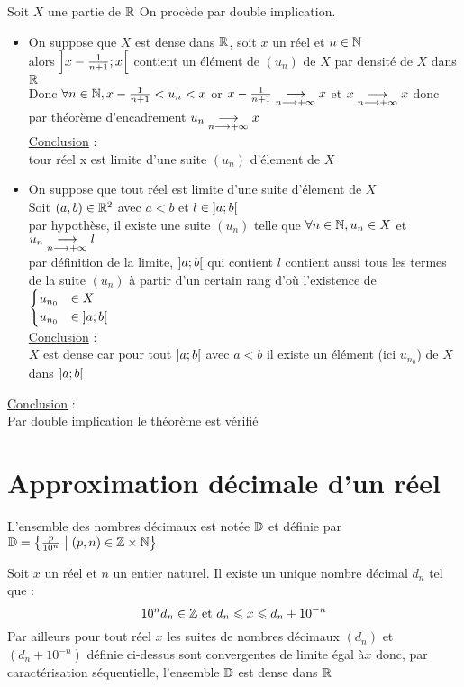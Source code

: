 \begin{dem}
    Soit \(X\) une partie de \(\mathbb{R}\)
    On procède par double implication.
    \begin{itemize}
    \item[\impdir]
    On suppose que \(X\) est dense dans \(\mathbb{R}\), soit \(x\) un réel et \(n\in\mathbb{N}\) \\
    alors \(\left]x-\frac{1}{n+1};x\right[\) contient un élément de \((u_n)\) de \(X\) par densité de \(X\) dans \(\mathbb{R}\) \\
    Donc \(\forall n \in \mathbb{N},x-\frac{1}{n+1}<u_n<x\) or \(x-\frac{1}{n+1} \underset{n\longrightarrow+\infty}{\longrightarrow}x\) et \(x\underset{n\longrightarrow+\infty}{\longrightarrow}x\) donc par théorème d'encadrement \(u_n \underset{n\longrightarrow+\infty}{\longrightarrow}x\) \\
    \underline{Conclusion} : \\
    tour réel x est limite d'une suite \((u_n)\) d'élement de \(X\)
    \item[\imprec] On suppose que tout réel est limite d'une suite d'élement de \(X\) \\
    Soit \((a,b)\in\mathbb{R}^2\) avec \(a<b\) et \(l\in \left]a;b\right[\)\\
    par hypothèse, il existe une suite \((u_n)\) telle que \(\forall n \in \mathbb{N}, u_n \in X\) et \(u_n\underset{n\longrightarrow+\infty}{\longrightarrow}l\)\\
    par définition de la limite, \(\left]a;b\right[\) qui contient \(l\) contient aussi tous les termes de la suite \((u_n)\) à partir d'un certain rang d'où l'existence de 
    \(\begin{cases}
        u_{n_0} &\in X \\
        u_{n_0} &\in \left]a;b\right[
    \end{cases}\)\\
    \underline{Conclusion} : \\
    \(X\) est dense car pour tout \(\left]a;b\right[\) avec \(a<b\) il existe un élément (ici \(u_{n_0}\)) de \(X\) dans \(\left]a;b\right[\)
    \end{itemize} 
    \underline{Conclusion} : \\
    Par double implication le théorème est vérifié
\end{dem}

\section{Approximation décimale d'un réel}
\begin{defprop}[rappel]
    L'ensemble des nombres décimaux est notée \(\mathbb{D}\) et définie par \(\mathbb{D} = \left\lbrace\frac{p}{10^n}\;\middle|\; (p,n)\in\mathbb{Z}\times\mathbb{N}\right\rbrace\)
\end{defprop}
\begin{prop}
    Soit \(x\) un réel et \(n\) un entier naturel. Il existe un unique nombre décimal \(d_n\) tel que :
    \[10^nd_n \in\mathbb{Z} \text{ et } d_n \leqslant x \leqslant d_n+10^{-n}\]
    Par ailleurs pour tout réel \(x\) les suites de nombres décimaux \((d_n)\) et \((d_n+10^{-n})\) définie ci-dessus sont convergentes de limite égal à\(x\) donc, par caractérisation séquentielle, l'ensemble \(\mathbb{D}\) est dense dans \(\mathbb{R}\)
\end{prop}

